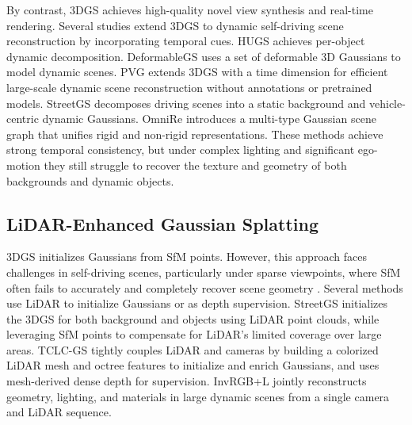 \documentclass[letterpaper, 10 pt, conference]{ieeeconf}  %
\begin{document}
By contrast, 3DGS \cite{ref1} achieves high-quality novel view synthesis and real-time rendering. Several studies \cite{ref10, ref23,ref24} extend 3DGS to dynamic self-driving scene reconstruction by incorporating temporal cues. HUGS \cite{ref11} achieves per-object dynamic decomposition. DeformableGS \cite{ref12} uses a set of deformable 3D Gaussians to model dynamic scenes.  PVG \cite{ref9} extends 3DGS with a time dimension for efficient large-scale dynamic scene reconstruction without annotations or pretrained models. StreetGS \cite{ref5} decomposes driving scenes into a static background and vehicle-centric dynamic Gaussians. OmniRe \cite{ref6} introduces a multi-type Gaussian scene graph that unifies rigid and non-rigid representations. These methods achieve strong temporal consistency, but under complex lighting and significant ego-motion they still struggle to recover the texture and geometry of both backgrounds and dynamic objects.

\subsection{LiDAR-Enhanced Gaussian Splatting}

3DGS \cite{ref1} initializes Gaussians from SfM points. However, this approach faces challenges in self-driving scenes, particularly under sparse viewpoints, where SfM often fails to accurately and completely recover scene geometry \cite{ref8,ref11,ref15}. Several methods \cite{ref6,ref9,ref10,ref29} use LiDAR to initialize Gaussians or as depth supervision.  StreetGS \cite{ref5}  initializes the 3DGS for both background and objects using LiDAR point clouds, while leveraging SfM points to compensate for LiDAR’s limited coverage over large areas. TCLC-GS \cite{ref25} tightly couples LiDAR and cameras by building a colorized LiDAR mesh and octree features to initialize and enrich Gaussians, and uses mesh-derived dense depth for supervision. InvRGB+L \cite{ref21} jointly reconstructs geometry, lighting, and materials in large dynamic scenes from a single camera and LiDAR sequence. 
\end{document}
